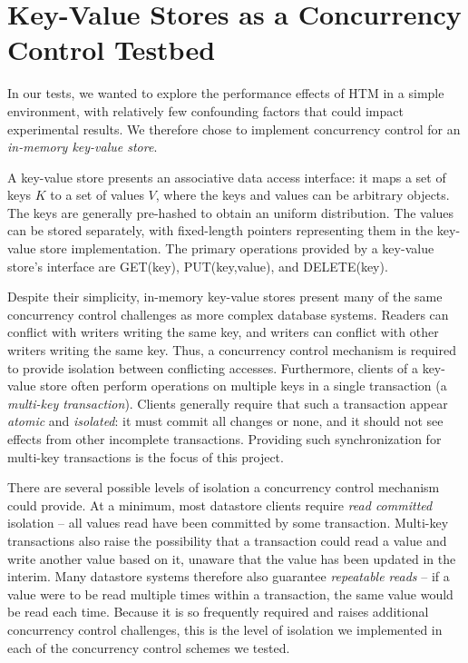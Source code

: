 \section{Key-Value Stores as a Concurrency Control Testbed} \label{sec:problem}

In our tests, we wanted to explore the performance effects of HTM in a simple
environment, with relatively few confounding factors that could impact
experimental results. We therefore chose to implement concurrency control for an
\textit{in-memory key-value store}.

A key-value store presents an associative data access interface: it maps a set
of keys $K$ to a set of values $V$, where the keys and values can be arbitrary
objects. The keys are generally pre-hashed to obtain an uniform distribution. The
values can be stored separately, with fixed-length pointers representing them in
the key-value store implementation. The primary operations provided by a
key-value store's interface are \textsc{GET}(key), \textsc{PUT}(key,value), and
\textsc{DELETE}(key).

Despite their simplicity, in-memory key-value stores present many of the same
concurrency control challenges as more complex database systems. Readers can
conflict with writers writing the same key, and writers can conflict with other
writers writing the same key. Thus, a concurrency control mechanism is required to provide
isolation between conflicting accesses. Furthermore, clients of a key-value
store often perform operations on multiple keys in a single transaction (a
\textit{multi-key transaction}). Clients generally require that such a
transaction appear \textit{atomic} and \textit{isolated}: it must commit all changes or none, and
it should not see effects from other incomplete transactions. Providing such
synchronization for multi-key transactions is the focus of this project.

There are several possible levels of isolation a concurrency control mechanism
could provide. At a minimum, most datastore clients require \textit{read
  committed} isolation -- all values read have been committed by some
transaction. Multi-key transactions also raise the possibility that a
transaction could read a value and write another value based on it, unaware that
the value has been updated in the interim. Many datastore systems therefore also
guarantee \textit{repeatable reads} -- if a value were to be read multiple times
within a transaction, the same value would be read each time. Because it is so
frequently required and raises additional concurrency control challenges, this
is the level of isolation we implemented in each of the concurrency control
schemes we tested.
